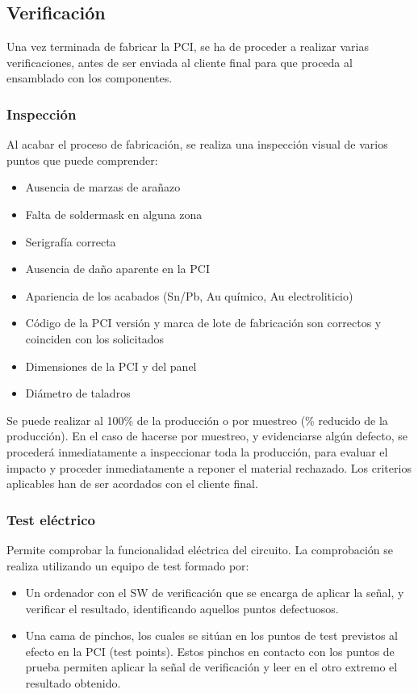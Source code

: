 \subsection{Verificación}
Una vez terminada de fabricar la PCI, se ha de proceder a realizar varias verificaciones, antes de ser enviada al cliente final para que proceda al ensamblado con los componentes.

\subsubsection{Inspección}
Al acabar el proceso de fabricación, se realiza una inspección visual de varios puntos que puede comprender:
\begin{itemize}
    \item Ausencia de marzas de arañazo
    \item Falta de soldermask en alguna zona
    \item Serigrafía correcta
    \item Ausencia de daño aparente en la PCI
    \item Apariencia de los acabados (Sn/Pb, Au químico, Au electroliticio)
    \item Código de la PCI versión y marca de lote de fabricación son correctos y coinciden con los solicitados
    \item Dimensiones de la PCI y del panel
    \item Diámetro de taladros
\end{itemize}

Se puede realizar al 100\% de la producción o por muestreo (\% reducido de la producción). En el caso de hacerse por muestreo, y evidenciarse algún defecto, se procederá inmediatamente a inspeccionar toda la producción, para evaluar el impacto y proceder inmediatamente a reponer el material rechazado. Los criterios aplicables han de ser acordados con el cliente final.

\subsubsection{Test eléctrico}
Permite comprobar la funcionalidad eléctrica del circuito. La comprobación se realiza utilizando un equipo de test formado por:
\begin{itemize}
    \item Un ordenador con el SW de verificación que se encarga de aplicar la señal, y verificar el resultado, identificando aquellos puntos defectuosos.
    \item Una cama de pinchos, los cuales se sitúan en los puntos de test previstos al efecto en la PCI (test points). Estos pinchos en contacto con los puntos de prueba permiten aplicar la señal de verificación y leer en el otro extremo el resultado obtenido.
\end{itemize}


